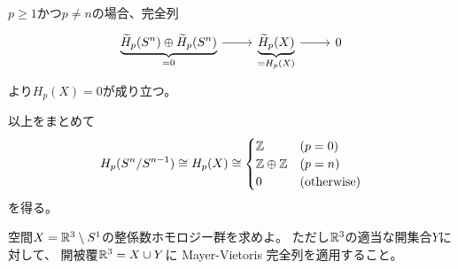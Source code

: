 \documentclass[report]{jlreq}
\begin{document}
\begin{answer}
    $p \ge 1$かつ$p \neq n$の場合、完全列
    \begin{equation}
        \begin{tikzcd}
            \underbrace{
                \widetilde{H}_p(S^n) \oplus \widetilde{H}_p(S^n)
            }_{\substack{
                = 0
            }}
                \ar{r}
                & \underbrace{
                    \widetilde{H}_p(X)
                }_{= H_p(X)}
                    \ar{r}
                & 0
        \end{tikzcd}
    \end{equation}
    より$H_p(X) = 0$が成り立つ。

    以上をまとめて
    \begin{equation}
        H_p(S^n / S^{n - 1}) \cong H_p(X) \cong \begin{cases}
            \mathbb{Z} & (p = 0) \\
            \mathbb{Z} \oplus \mathbb{Z} & (p = n) \\
            0 & (\text{otherwise})
        \end{cases}
    \end{equation}
    を得る。
\end{answer}

\begin{problem}
    空間$X = \mathbb{R}^3 \setminus S^1$の整係数ホモロジー群を求めよ。
    ただし$\mathbb{R}^3$の適当な開集合$Y$に対して、
    開被覆$\mathbb{R}^3 = X \cup Y$に
    Mayer-Vietoris 完全列を適用すること。
\end{problem}
\end{document}
